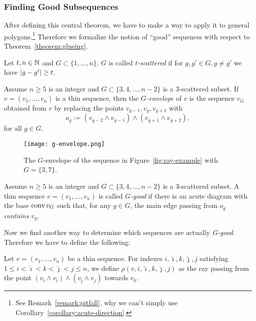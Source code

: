 \subsubsection{Finding Good Subsequences}

After defining this central theorem, we have to make a way to apply it to general polygons.\footnote{See Remark~\ref{remark:pitfall}, why we can't simply use Corollary~\ref{corollary:acute-direction}.}
Therefore we formalize the notion of ``good'' sequences with respect to Theorem~\ref{theorem:glueing}.

\begin{definition}
  Let $t, n \in \mathbb{N}$ and $G \subset \{1,\dots,n\}$. $G$ is called $t$\emph{-scattered} if for $g, g' \in G, g \neq g'$ we have $\lvert g-g'\rvert \geq t$.
\end{definition}

\begin{definition}[G-envelope]\label{definition:g-envelope}
  Assume $n\geq 5$ is an integer and $G\subset\{3,4,\dots,n-2\}$ is a $3$-scattered subset. If $v=(v_1,\dots,v_n)$ is a thin sequence, then the $G$\emph{-envelope} of $v$ is the sequence $v_G$ obtained from $v$ by replacing the points $v_{g-1}, v_g, v_{g+1}$ with $$o_g:=(v_{g-2}\wedge v_{g-1})\wedge (v_{g+1}\wedge v_{g+2}),$$ for all $g\in G$.
\end{definition}

\begin{figure}[h]
  \centering
  \texttt{[image: g-envelope.png]}
  \caption{The $G$-envelope of the sequence in Figure~\ref{fig:ray-example} with $G=\{3,7\}$. \cite[Figure~6]{shitov2020sublinear}}
  \label{fig:g-envelope}
\end{figure}

\begin{definition}[G-good]
  Assume $n\geq 5$ is an integer and $G\subset\{3,4,\dots,n-2\}$ is a $3$-scattered subset. A thin sequence $v=(v_1,\dots,v_n)$ is called $G$\emph{-good} if there is an acute diagram with the base $\operatorname{conv} v_G$ such that, for any $g\in G$, the main edge passing from $o_g$ \emph{contains} $v_g$.
\end{definition}

Now we find another way to determine which sequences are actually \emph{G-good}. Therefore we have to define the following:

\begin{definition}
  Let $v=(v_1,\dots,v_n)$ be a thin sequence. For indexes $i,\hat{\imath},k, \hat{\jmath}, j$ satisfying $1\leq i<\hat{\imath}<k<\hat{\jmath}<j\leq n$, we define $\rho(v,i,\hat{\imath},k, \hat{\jmath}, j)$ as the ray passing from the point $(v_i\wedge v_{\hat{\imath}})\wedge(v_{\hat{\jmath}}\wedge v_j)$ towards $v_k$. 
\end{definition}

